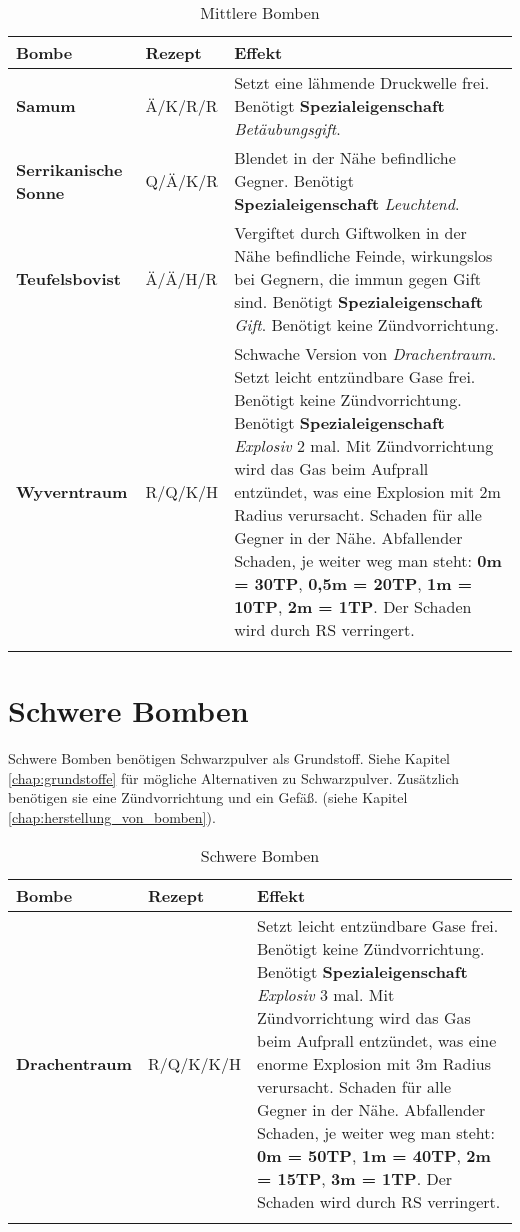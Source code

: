 \begin{longtable}{|p{4cm}|p{}|p{9cm}|}
\hline
\textbf{Bombe} & \textbf{Rezept} & \textbf{Effekt} \\ \hline

\textbf{Samum} & Ä/K/R/R & Setzt eine lähmende Druckwelle frei. Benötigt \textbf{Spezialeigenschaft} \textit{Betäubungsgift}. \\ \hline

\textbf{Serrikanische Sonne} & Q/Ä/K/R & Blendet in der Nähe befindliche Gegner. Benötigt \textbf{Spezialeigenschaft} \textit{Leuchtend}. \\ \hline

\textbf{Teufelsbovist} & Ä/Ä/H/R & Vergiftet durch Giftwolken in der Nähe befindliche Feinde, wirkungslos bei Gegnern, die immun gegen Gift sind. Benötigt \textbf{Spezialeigenschaft} \textit{Gift}. Benötigt keine Zündvorrichtung. \\ \hline

\textbf{Wyverntraum} & R/Q/K/H & Schwache Version von \textit{Drachentraum}. Setzt leicht entzündbare Gase frei. Benötigt keine Zündvorrichtung. Benötigt \textbf{Spezialeigenschaft} \textit{Explosiv} 2 mal. Mit Zündvorrichtung wird das Gas beim Aufprall entzündet, was eine Explosion mit 2m Radius verursacht. Schaden für alle Gegner in der Nähe. Abfallender Schaden, je weiter weg man steht: \textbf{0m = 30TP}, \textbf{0,5m = 20TP}, \textbf{1m = 10TP}, \textbf{2m = 1TP}. Der Schaden wird durch RS verringert. \\ \hline

\caption{Mittlere Bomben}
\label{tab:mittlere_bomben}
\end{longtable}


\section{Schwere Bomben}
Schwere Bomben benötigen Schwarzpulver als Grundstoff. Siehe Kapitel \ref{chap:grundstoffe} für mögliche Alternativen zu Schwarzpulver. Zusätzlich benötigen sie eine Zündvorrichtung und ein Gefäß. (siehe Kapitel \ref{chap:herstellung_von_bomben}).

\begin{longtable}{|p{4cm}|p{}|p{9cm}|}
\hline
\textbf{Bombe} & \textbf{Rezept} & \textbf{Effekt} \\ \hline

\textbf{Drachentraum} & R/Q/K/K/H & Setzt leicht entzündbare Gase frei. Benötigt keine Zündvorrichtung. Benötigt \textbf{Spezialeigenschaft} \textit{Explosiv} 3 mal. Mit Zündvorrichtung wird das Gas beim Aufprall entzündet, was eine enorme Explosion mit 3m Radius verursacht. Schaden für alle Gegner in der Nähe. Abfallender Schaden, je weiter weg man steht: \textbf{0m = 50TP}, \textbf{1m = 40TP}, \textbf{2m = 15TP}, \textbf{3m = 1TP}. Der Schaden wird durch RS verringert. \\ \hline

\caption{Schwere Bomben}
\label{tab:schwere_bomben}
\end{longtable}